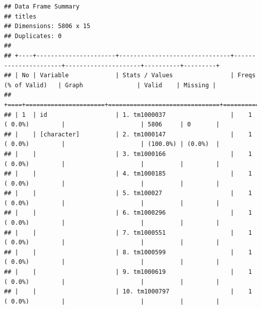 \documentclass[11pt,preprint]{elsarticle}
\numberwithin{equation}{section}
\numberwithin{figure}{section}
\numberwithin{table}{section}
\begin{document}
\begin{Shaded}
\begin{Highlighting}[]
\NormalTok{(} \NormalTok{, } \NormalTok{)}

\OtherTok{\textless{}{-}}  \NormalTok{, } \NormalTok{)}
\end{Highlighting}
\end{Shaded}

\begin{verbatim}
## Data Frame Summary  
## titles  
## Dimensions: 5806 x 15  
## Duplicates: 0  
## 
## +----+----------------------+-------------------------------+----------------------+---------------------+----------+---------+
## | No | Variable             | Stats / Values                | Freqs (% of Valid)   | Graph               | Valid    | Missing |
## +====+======================+===============================+======================+=====================+==========+=========+
## | 1  | id                   | 1. tm1000037                  |    1 ( 0.0%)         |                     | 5806     | 0       |
## |    | [character]          | 2. tm1000147                  |    1 ( 0.0%)         |                     | (100.0%) | (0.0%)  |
## |    |                      | 3. tm1000166                  |    1 ( 0.0%)         |                     |          |         |
## |    |                      | 4. tm1000185                  |    1 ( 0.0%)         |                     |          |         |
## |    |                      | 5. tm100027                   |    1 ( 0.0%)         |                     |          |         |
## |    |                      | 6. tm1000296                  |    1 ( 0.0%)         |                     |          |         |
## |    |                      | 7. tm1000551                  |    1 ( 0.0%)         |                     |          |         |
## |    |                      | 8. tm1000599                  |    1 ( 0.0%)         |                     |          |         |
## |    |                      | 9. tm1000619                  |    1 ( 0.0%)         |                     |          |         |
## |    |                      | 10. tm1000797                 |    1 ( 0.0%)         |                     |          |         |

\end{verbatim}
\end{document}
